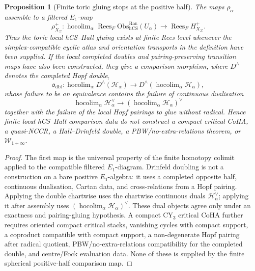 \documentclass[11pt]{amsart}
\providecommand{\cW}{\mathcal{W}}
\providecommand{\hCS}{\mathrm{hCS}}
\providecommand{\Obs}{\mathrm{Obs}}
\newtheorem{proposition}[theorem]{Proposition}
\theoremstyle{definition}
\theoremstyle{remark}
\begin{document}
\begin{proposition}[Finite toric gluing stops at the positive half]
The maps \(\rho_\alpha\) assemble to a filtered \(E_1\)-map
\[
        \rho^+_{X_\Sigma}\colon
        \operatorname{hocolim}_{\alpha}
        \operatorname{Rees}_F\Obs^{\mathrm{Ran}}_{\hCS}(U_\alpha)
        \longrightarrow
        \operatorname{Rees}_F H^+_{X_\Sigma}.
\]
Thus the toric local hCS--Hall gluing exists at finite Rees level whenever
the simplex-compatible cyclic atlas and orientation transports in the
definition have been supplied.
If the local completed doubles and pairing-preserving transition maps have
also been constructed, they give a comparison morphism, where
\(D^\wedge\) denotes the completed Hopf double,
\[
        \mathfrak{o}_{\mathrm{dbl}}\colon
        \operatorname{hocolim}_{\alpha}D^\wedge(\mathcal{H}_\alpha)
        \longrightarrow
        D^\wedge\!\left(\operatorname{hocolim}_{\alpha}\mathcal{H}_\alpha\right),
\]
whose failure to be an equivalence contains the failure of continuous
dualisation
\[
        \operatorname{hocolim}_{\alpha}\mathcal{H}_\alpha^\vee
        \longrightarrow
        \left(\operatorname{hocolim}_{\alpha}\mathcal{H}_\alpha\right)^\vee
\]
together with the failure of the local Hopf pairings to glue without
radical. Hence finite local hCS--Hall comparison data do not construct a
compact critical CoHA, a quasi-NCCR, a Hall--Drinfeld double, a
PBW/no-extra-relations theorem, or \(\cW_{1+\infty}\).
\end{proposition}

\begin{proof}
The first map is the universal property of the finite homotopy colimit
applied to the compatible filtered \(E_1\)-diagram. Drinfeld doubling is
not a construction on a bare positive \(E_1\)-algebra: it uses a completed
opposite half, continuous dualisation, Cartan data, and cross-relations
from a Hopf pairing. Applying the double chartwise uses the chartwise
continuous duals \(\mathcal{H}_\alpha^\vee\); applying it after assembly
uses \((\operatorname{hocolim}_\alpha\mathcal{H}_\alpha)^\vee\). These
dual objects agree only under an exactness and pairing-gluing hypothesis.
A compact CY$_3$ critical CoHA further requires oriented compact critical
stacks, vanishing cycles with compact support, a coproduct compatible with
compact support, a non-degenerate Hopf pairing after radical quotient,
PBW/no-extra-relations compatibility for the completed double, and
centre/Fock evaluation data. None of these is supplied by the finite
spherical positive-half comparison map.
\end{proof}
\end{document}
